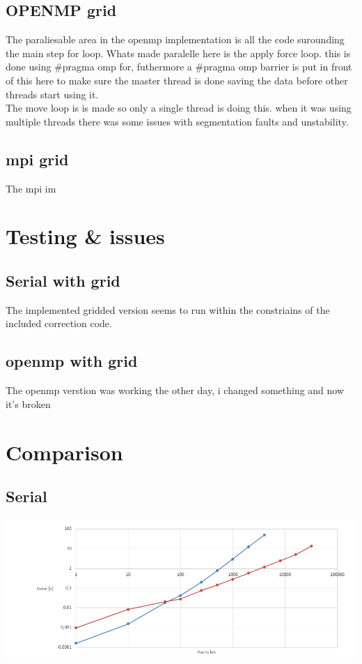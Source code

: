 \documentclass[a4paper,10pt,titlepage]{report}
\begin{document}
\subsection{OPENMP grid}
The paraliesable area in the openmp implementation is all the code surounding the main step for loop. Whats made paralelle here is the apply force loop. this is done using \#pragma omp for, futhermore a \#pragma omp barrier is put in front of this here to make sure the master thread is done saving the data before other threads start using it. \\

The move loop is is made so only a single thread is doing this. when it was using multiple threads there was some issues with segmentation faults and unstability. \\

\subsection{mpi grid}
The mpi im


\section{Testing \& issues}

\subsection{Serial with grid}
The implemented gridded version seems to run within the constriains of the included correction code.

\subsection{openmp with grid}
The openmp verstion was working the other day, i changed something and now it's broken


\section{Comparison}

\subsection{Serial}
\includegraphics[scale=0.3]{oldvsnew}
\end{document}
